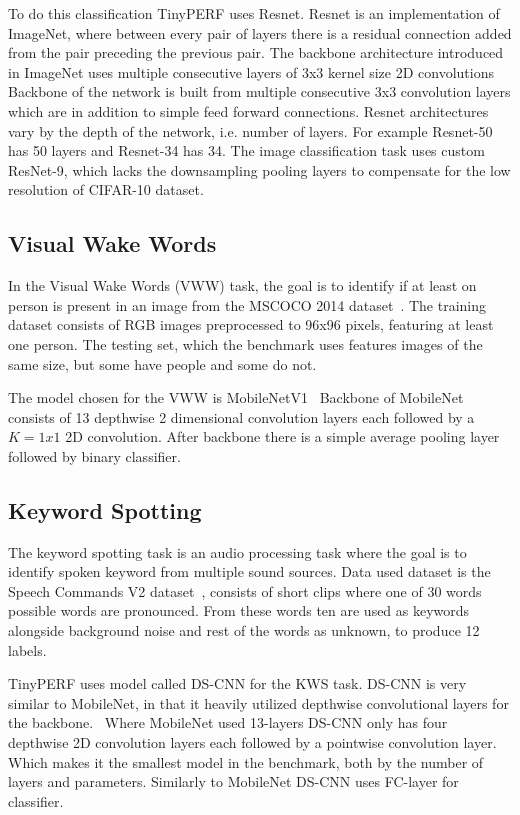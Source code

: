 \documentclass[12pt,a4paper,english
]{tunithesis}
\begin{document}
To do this classification TinyPERF uses Resnet. Resnet is an implementation of ImageNet, where between every pair of layers there is a residual connection added from the pair preceding the previous pair.
The backbone architecture introduced in ImageNet uses multiple consecutive layers of 3x3 kernel size 2D convolutions
Backbone of the network is built from multiple consecutive 3x3 convolution layers which are in addition to simple feed forward connections.
Resnet architectures vary by the depth of the network, i.e. number of layers. For example Resnet-50 has 50 layers and Resnet-34 has 34. The image classification task uses custom ResNet-9, which lacks the downsampling pooling layers to compensate for the low resolution of CIFAR-10 dataset.

\subsection{Visual Wake Words}
In the Visual Wake Words (VWW) task, the goal is to identify if at least on person is present in an image from the MSCOCO 2014 dataset~\cite{lin_microsoft_2015}.
The training dataset consists of RGB images preprocessed to 96x96 pixels, featuring at least one person. The testing set, which the benchmark uses features images of the same size, but some have people and some do not.

The model chosen for the VWW is MobileNetV1~\cite{howard2017mobilenetsefficientconvolutionalneural}
Backbone of MobileNet consists of 13 depthwise 2 dimensional convolution layers each followed by a $K=1x1$ 2D convolution. After backbone there is a simple average pooling layer followed by binary classifier.

\subsection{Keyword Spotting}
The keyword spotting task is an audio processing task where the goal is to identify spoken keyword from multiple sound sources. Data used dataset is the Speech Commands V2 dataset~\cite{warden_speech_2018}, consists of short clips where one of 30 words possible words are pronounced. From these words ten are used as keywords alongside background noise and rest of the words as unknown, to produce 12 labels.

TinyPERF uses model called DS-CNN for the KWS task.
DS-CNN is very similar to MobileNet, in that it heavily utilized depthwise convolutional layers for the backbone.~\cite{shaheed_ds-cnn_2022}
Where MobileNet used 13-layers DS-CNN only has four depthwise 2D convolution layers each followed by a pointwise convolution layer. Which makes it the smallest model in the benchmark, both by the number of layers and parameters.
Similarly to MobileNet DS-CNN uses FC-layer for classifier.
\end{document}
